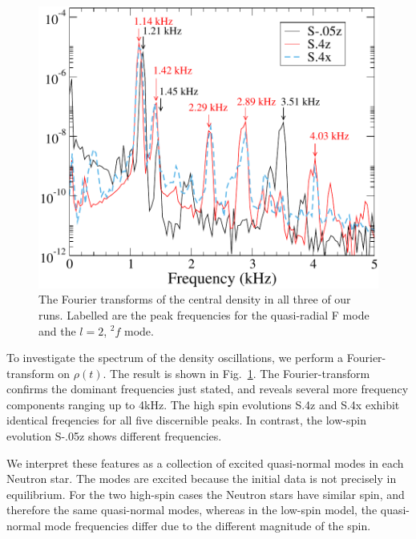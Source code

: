 \documentclass[aps,prd,amsmath,floatfix
,twocolumn
,superscriptaddress,nofootinbib,showpacs]{revtex4-1}
\theoremstyle{plain} \newtheorem{thm}{Theorem} \newtheorem{lem}{Lemma}
\newcommand{\red}[1]{\textcolor{Red}{#1}}
\newcommand{\nick}[1]{\textcolor{blue}{\textit{Nick: #1}}}
\begin{document}

\begin{figure}
\includegraphics[width=0.95\columnwidth]{Density_FFT}
\caption{\label{fig:Density_FFT} The Fourier transforms of the central
  density in all three of our runs. Labelled are the peak frequencies
  for the quasi-radial F mode and the $l=2$, $^2f$ mode.}
\end{figure}

To investigate the spectrum of the density oscillations, we perform a
Fourier-transform on $\rho(t)$.  The result is shown in
Fig.~\ref{fig:Density_FFT}.  The Fourier-transform confirms the
dominant frequencies just stated, and reveals several more frequency
components ranging up to 4kHz.  The high spin evolutions S.4z and
S.4x exhibit identical freqencies for all five discernible peaks.  In
contrast, the low-spin evolution S-.05z shows different frequencies.  

We interpret these features as a collection of excited quasi-normal
modes in each Neutron star.  The modes are excited because the initial
data is not precisely in equilibrium.  For the two high-spin cases the
Neutron stars have similar spin, and therefore the same quasi-normal
modes, whereas in the low-spin model, the quasi-normal mode
frequencies differ due to the different magnitude of the spin.
\end{document}
